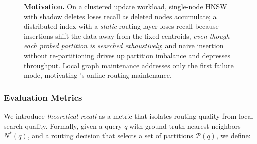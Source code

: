 \documentclass[sigconf,review,anonymous]{acmart}
\begin{document}
    \begin{figure}
        \centering
        \caption{\textbf{Motivation.} On a clustered update workload, single-node HNSW with shadow deletes loses recall as deleted nodes accumulate; a distributed index with a \emph{static} routing layer loses recall because insertions shift the data away from the fixed centroids, \emph{even though each probed partition is searched exhaustively}; and naive insertion without re-partitioning drives up partition imbalance and depresses throughput. Local graph maintenance addresses only the first failure mode, motivating \SystemName{}'s online routing maintenance.}
        \label{fig:motivation}
    \end{figure}


    \subsubsection{Evaluation Metrics}
    \label{sec:eval-metrics}

    We introduce \textit{theoretical recall} as a metric that isolates routing quality from local search quality. Formally, given a query $q$ with ground-truth nearest neighbors $N^*(q)$, and a routing decision that selects a set of partitions $\mathcal{P}(q)$, we define:
    
\end{document}
